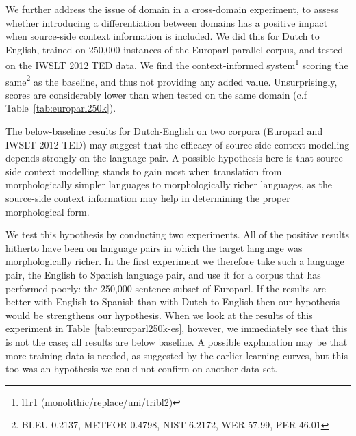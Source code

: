 \documentclass[smallextended]{svjour3}       %
\theoremstyle{break}
\begin{document}
We further address the issue of domain in a cross-domain experiment, to assess
whether introducing a differentiation between domains has a positive impact
when source-side context information is included. We did this for Dutch to
English, trained on 250,000 instances of the Europarl parallel corpus, and
tested on the IWSLT 2012 TED data. We find the context-informed
system\footnote{l1r1 (monolithic/replace/uni/tribl2)} scoring the
same\footnote{BLEU 0.2137, METEOR 0.4798, NIST 6.2172, WER 57.99, PER 46.01} as
the baseline, and thus not providing any added value. Unsurprisingly, scores
are considerably lower than when tested on the same domain (c.f
Table~\ref{tab:europarl250k}).

The below-baseline results for Dutch-English on two corpora (Europarl and IWSLT
2012 TED) may suggest that the efficacy of source-side context modelling
depends strongly on the language pair. A possible hypothesis here is that
source-side context modelling stands to gain most when translation from
morphologically simpler languages to morphologically richer languages, as the
source-side context information may help in determining the proper
morphological form. 

We test this hypothesis by conducting two experiments. All of the positive
results hitherto have been on language pairs in which the target language was
morphologically richer.  In the first experiment we therefore take such a
language pair, the English to Spanish language pair, and use it for a corpus
that has performed poorly: the 250,000 sentence subset of Europarl.  If the
results are better with English to Spanish than with Dutch to English then our
hypothesis would be strengthens our hypothesis. When we look at the results of
this experiment in Table~\ref{tab:europarl250k-es}, however, we immediately see
that this is not the case; all results are below baseline. A possible
explanation may be that more training data is needed, as suggested by the
earlier learning curves, but this too was an hypothesis we could not confirm on
another data set.
\end{document}
